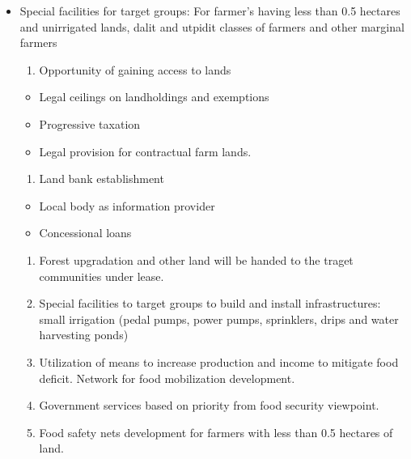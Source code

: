 \documentclass[
]{book}
\providecommand{\tightlist}{%
  \setlength{\itemsep}{0pt}\setlength{\parskip}{0pt}}
\begin{document}
\begin{itemize}
\tightlist
\item
  Special facilities for target groups: For farmer's having less than 0.5 hectares and unirrigated lands, dalit and utpidit classes of farmers and other marginal farmers

  \begin{enumerate}
  \def\labelenumi{\arabic{enumi}.}
  \tightlist
  \item
    Opportunity of gaining access to lands
  \end{enumerate}

  \begin{itemize}
  \tightlist
  \item
    Legal ceilings on landholdings and exemptions
  \item
    Progressive taxation
  \item
    Legal provision for contractual farm lands.
  \end{itemize}

  \begin{enumerate}
  \def\labelenumi{\arabic{enumi}.}
  \setcounter{enumi}{1}
  \tightlist
  \item
    Land bank establishment
  \end{enumerate}

  \begin{itemize}
  \tightlist
  \item
    Local body as information provider
  \item
    Concessional loans
  \end{itemize}

  \begin{enumerate}
  \def\labelenumi{\arabic{enumi}.}
  \setcounter{enumi}{2}
  \tightlist
  \item
    Forest upgradation and other land will be handed to the traget communities under lease.
  \item
    Special facilities to target groups to build and install infrastructures: small irrigation (pedal pumps, power pumps, sprinklers, drips and water harvesting ponds)
  \item
    Utilization of means to increase production and income to mitigate food deficit. Network for food mobilization development.
  \item
    Government services based on priority from food security viewpoint.
  \item
    Food safety nets development for farmers with less than 0.5 hectares of land.
  \end{enumerate}
\end{itemize}
\end{document}
